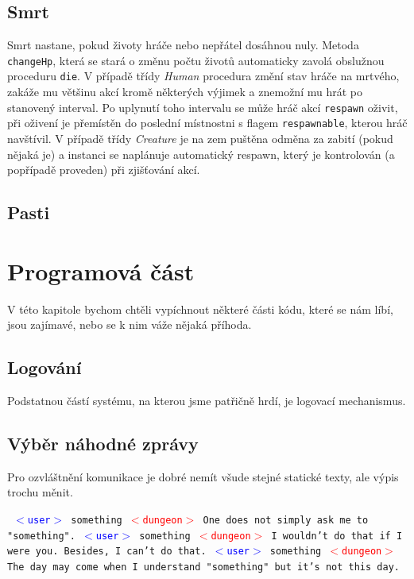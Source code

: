 \documentclass[11pt, a4paper]{article}
\def\class#1{\emph{#1}}
\newenvironment{example}%
{\smallskip\noindent\ignorespaces\obeylines\tt}%
{\smallskip\par\noindent
\ignorespacesafterend}
\def\user{\textcolor{blue}{$<$user$>$ }}
\def\dung{\textcolor{red}{$<$dungeon$>$ }}
\begin{document}
\subsection{Smrt}

Smrt nastane, pokud životy hráče nebo nepřátel dosáhnou nuly. Metoda \texttt{changeHp}, která se stará o změnu počtu životů automaticky zavolá obslužnou proceduru \texttt{die}. V případě třídy \class{Human} procedura změní stav hráče na mrtvého, zakáže mu většinu akcí kromě některých výjimek a znemožní mu hrát po stanovený interval. Po uplynutí toho intervalu se může hráč akcí \texttt{respawn} oživit, při oživení je přemístěn do poslední místnostni s flagem \texttt{respawnable}, kterou hráč navštívil. V případě třídy \class{Creature} je na zem puštěna odměna za zabití (pokud nějaká je) a instanci se naplánuje automatický respawn, který je kontrolován (a popřípadě proveden) při zjišťování akcí.

\subsection{Pasti}


\section{Programová část}

V této kapitole bychom chtěli vypíchnout některé části kódu, které se nám líbí, jsou zajímavé, nebo se k nim váže nějaká příhoda.

\subsection{Logování}

Podstatnou částí systému, na kterou jsme patřičně hrdí, je logovací mechanismus.


\subsection{Výběr náhodné zprávy}

Pro ozvláštnění komunikace je dobré nemít všude stejné statické texty, ale výpis trochu měnit.

\begin{example}
\user something
\dung One does not simply ask me to "something".
\user something
\dung I wouldn't do that if I were you. Besides, I can't do that.
\user something
\dung The day may come when I understand "something"{} but it's not 
this day.
\end{example}
\end{document}
